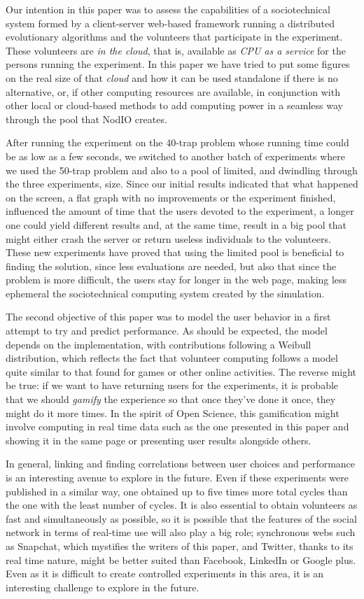\documentclass[letterpaper]{article}
\begin{document}
Our intention in this paper was to assess the capabilities of a
sociotechnical system formed by a client-server web-based framework
running a distributed evolutionary algorithms and the volunteers that
participate in the experiment. These volunteers are {\em in the
  cloud}, that is, available as {\em CPU as a service} for the persons
running the experiment. In this paper we have tried to put some figures
on the real size of that {\em cloud} and how it can be used standalone
if there is no alternative, or, if other computing resources are
available, in conjunction with other local or cloud-based methods to
add computing power in a seamless way through the pool that NodIO creates. 

After running the experiment on the 40-trap problem whose running time
could be as low as a few seconds, we switched to another batch of
experiments where we used the 50-trap problem and also to a pool of
limited, and dwindling through the three experiments, size. Since our
initial results indicated that what happened on the screen, a flat
graph with no improvements or the experiment finished, influenced the
amount of time that the users devoted to the experiment, a longer one
could yield different results and, at the same time, result in a big
pool that might either crash the server or return useless individuals
to the volunteers. These new experiments have proved that using the
limited pool is beneficial to finding the solution, since less
evaluations are needed, but also that since the problem is more
difficult, the users stay for longer in the web page, making less
ephemeral the sociotechnical computing system created by the
simulation. 


The second objective of this paper was to model the user behavior in a
first attempt to try and predict performance. As should be expected,
the model depends on the implementation, with contributions following
a Weibull distribution, which reflects the fact
that volunteer computing follows a model quite similar to that found
for games or other online activities. The reverse might be true: if we
want to have returning users for the experiments, it is probable that
we should {\em gamify} the experience so that once they've done it
once, they might do it more times. In the spirit of Open Science, this
gamification might involve computing in real time data such as the one
presented in this paper and showing it in the same page or presenting
user results alongside others.

In general, linking and finding correlations between user choices and
performance is an interesting avenue to explore in the future. Even if
these  experiments were published in a similar way, one
obtained up to five times more total cycles than the one with the least
number of cycles. It is also essential to obtain volunteers as fast and
simultaneously as possible, so it is possible that the features of the
social network in terms of real-time use will also play a big
role; synchronous webs such as Snapchat, which mystifies the writers
of this paper, and Twitter, thanks to its real time nature, might be
better suited than Facebook, LinkedIn or Google plus. Even as it is
difficult to create controlled experiments in this 
area, it is an interesting challenge to explore in the future.
\end{document}
